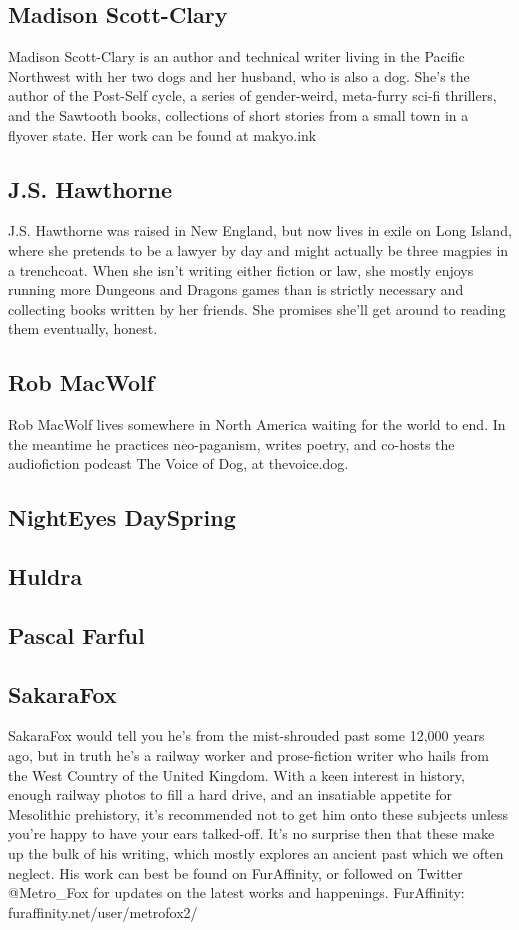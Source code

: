 \subsection*{Madison Scott-Clary}
Madison Scott-Clary is an author and technical writer living in the Pacific Northwest with her two dogs and her husband, who is also a dog. She's the author of the Post-Self cycle, a series of gender-weird, meta-furry sci-fi thrillers, and the Sawtooth books, collections of short stories from a small town in a flyover state. Her work can be found at makyo.ink

\subsection*{J.S. Hawthorne}
J.S. Hawthorne was raised in New England, but now lives in exile on Long Island, where she pretends to be a lawyer by day and might actually be three magpies in a trenchcoat. When she isn't writing either fiction or law, she mostly enjoys running more Dungeons and Dragons games than is strictly necessary and collecting books written by her friends. She promises she'll get around to reading them eventually, honest.

\subsection*{Rob MacWolf}
Rob MacWolf lives somewhere in North America waiting for the world to end. In the meantime he practices neo-paganism, writes poetry, and co-hosts the audiofiction podcast The Voice of Dog, at thevoice.dog.

\subsection*{NightEyes DaySpring}

\subsection*{Huldra}

\subsection*{Pascal Farful}

\subsection*{SakaraFox}
SakaraFox would tell you he’s from the mist-shrouded past some 12,000 years ago, but in truth he’s a railway worker and prose-fiction writer who hails from the West Country of the United Kingdom. With a keen interest in history, enough railway photos to fill a hard drive, and an insatiable appetite for Mesolithic prehistory, it’s recommended not to get him onto these subjects unless you’re happy to have your ears talked-off. It’s no surprise then that these make up the bulk of his writing, which mostly explores an ancient past which we often neglect. His work can best be found on FurAffinity, or followed on Twitter @Metro\_Fox for updates on the latest works and happenings. FurAffinity: furaffinity.net/user/metrofox2/

